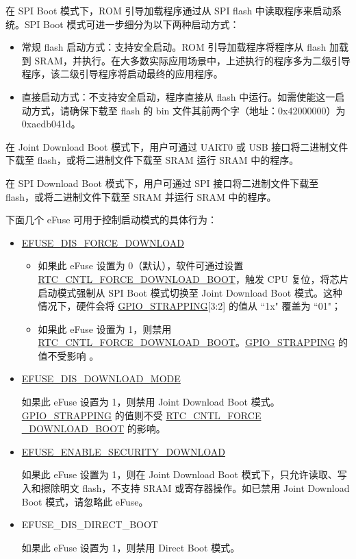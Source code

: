 \documentclass[main\_\_CN.tex]{subfiles}
\begin{document}
在 SPI Boot 模式下，ROM 引导加载程序通过从 SPI flash 中读取程序来启动系统。SPI Boot 模式可进一步细分为以下两种启动方式：
\begin{itemize}
    \item 常规 flash 启动方式：支持安全启动。ROM 引导加载程序将程序从 flash 加载到 SRAM，并执行。在大多数实际应用场景中，上述执行的程序多为二级引导程序，该二级引导程序将启动最终的应用程序。
    \item 直接启动方式：不支持安全启动，程序直接从 flash 中运行。如需使能这一启动方式，请确保下载至 flash 的 bin 文件其前两个字（地址：0x42000000）为 0xaedb041d。
\end{itemize}

在 Joint Download Boot 模式下，用户可通过 UART0 或 USB 接口将二进制文件下载至 flash，或将二进制文件下载至 SRAM 运行 SRAM 中的程序。

在 SPI Download Boot 模式下，用户可通过 SPI 接口将二进制文件下载至 flash，或将二进制文件下载至 SRAM 并运行 SRAM 中的程序。

下面几个 eFuse 可用于控制启动模式的具体行为：

\begin{itemize}
    \item \hyperref[fielddesc:EFUSEDISFORCEDOWNLOAD]{EFUSE\_DIS\_FORCE\_DOWNLOAD}
    \begin{itemize}
    \item 如果此 eFuse 设置为 0（默认），软件可通过设置 \hyperref[fielddesc:RTCCNTLFORCEDOWNLOADBOOT]{RTC\_CNTL\_FORCE\_DOWNLOAD\_BOOT}，触发 CPU 复位，将芯片启动模式强制从 SPI Boot 模式切换至 Joint Download Boot 模式。这种情况下，硬件会将 \hyperref[fielddesc:GPIOSTRAPPING]{GPIO\_STRAPPING}[3:2] 的值从 ``1x" 覆盖为 ``01"；
    \item 如果此 eFuse 设置为 1，则禁用 \hyperref[fielddesc:RTCCNTLFORCEDOWNLOADBOOT]{RTC\_CNTL\_FORCE\_DOWNLOAD\_BOOT}。\hyperref[fielddesc:GPIOSTRAPPING]{GPIO\_STRAPPING} 的值不受影响 。
    \end{itemize}

    \item \hyperref[fielddesc:EFUSEDISDOWNLOADMODE]{EFUSE\_DIS\_DOWNLOAD\_MODE}

    如果此 eFuse 设置为 1，则禁用 Joint Download Boot 模式。\hyperref[fielddesc:GPIOSTRAPPING]{GPIO\_STRAPPING} 的值则不受 \hyperref[fielddesc:RTCCNTLFORCEDOWNLOADBOOT]{RTC\_CNTL\_FORCE\\\_DOWNLOAD\_BOOT} 的影响。
    \item \hyperref[fielddesc:EFUSEENABLESECURITYDOWNLOAD]{EFUSE\_ENABLE\_SECURITY\_DOWNLOAD}

    如果此 eFuse 设置为 1，则在 Joint Download Boot 模式下，只允许读取、写入和擦除明文 flash，不支持 SRAM 或寄存器操作。如已禁用 Joint Download Boot 模式，请忽略此 eFuse。

    \item EFUSE\_DIS\_DIRECT\_BOOT

    如果此 eFuse 设置为 1，则禁用 Direct Boot 模式。
\end{itemize}
\end{document}
